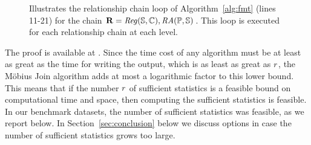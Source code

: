 \documentclass{sig-alternate-2013}
\begin{document}
\begin{figure}[htbp]
\begin{center}
\caption{Illustrates the relationship chain loop of Algorithm~\ref{alg:fmt} (lines 11-21) for the chain $\mathbf{R}= \it{Reg}(\mathbb{S},\mathbb{C}),\mathit{RA}(\mathbb{P},\mathbb{S})$. This loop is executed for each relationship chain at each level.\label{fig:rchain-loop}}
\end{center}
\end{figure}


The proof is available at \cite{Qian2014}.
Since the time cost of any algorithm must be at least as great as the time for writing the output, which is as least as great as $r$, 
the M\"obius Join algorithm adds at most a logarithmic factor to this lower bound. 
This means that
if the number $r$ of sufficient statistics is a feasible bound on computational time and space, then computing the sufficient statistics is feasible. In our benchmark datasets, the number of sufficient statistics was feasible, as we report below. 
In Section~\ref{sec:conclusion} below we discuss options in case the number of sufficient statistics  grows too large.
\end{document}
